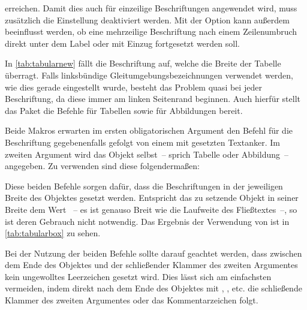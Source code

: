 \documentclass[%
  english,ngerman,%
  cdgeometry=no,DIV=12,automark,%
]{tudscrartcl}
\begin{document}
erreichen. Damit dies auch für einzeilige Beschriftungen angewendet wird, muss 
zusätzlich die Einstellung  deaktiviert werden. Mit der 
Option  kann außerdem beeinflusst werden, ob eine mehrzeilige 
Beschriftung nach einem Zeilenumbruch direkt unter dem Label oder mit Einzug 
fortgesetzt werden soll.
%
\begin{Preamble*}
\captionsetup{singlelinecheck=off,format=hang,justification=raggedright}
\end{Preamble*}
%
In \autoref{tab:tabularnew} fällt die Beschriftung auf, welche die Breite der 
Tabelle überragt. Falls linksbündige Gleitumgebungsbezeichnungen verwendet 
werden, wie dies gerade eingestellt wurde, besteht das Problem quasi bei jeder 
Beschriftung, da diese immer am linken Seitenrand beginnen. Auch hierfür stellt 
das Paket  die Befehle  für Tabellen sowie 
 für Abbildungen bereit. 

Beide Makros erwarten im ersten obligatorischen Argument den Befehl 
 für die Beschriftung gegebenenfalls gefolgt von einem mit 
 gesetzten Textanker. Im zweiten Argument wird das Objekt 
selbst~-- sprich Tabelle oder Abbildung~-- angegeben. Zu verwenden sind diese 
folgendermaßen:
%
%
Diese beiden Befehle sorgen dafür, dass die Beschriftungen in der jeweiligen 
Breite des Objektes gesetzt werden. Entspricht das zu setzende Objekt in seiner 
Breite dem Wert ~-- es ist genauso Breit wie die Laufweite 
des Fließtextes~--, so ist deren Gebrauch nicht notwendig. Das Ergebnis der 
Verwendung von  ist in \autoref{tab:tabularbox} zu sehen.

Bei der Nutzung der beiden Befehle sollte darauf geachtet werden, dass zwischen 
dem Ende des Objektes und der schließender Klammer des zweiten Argumentes kein 
ungewolltes Leerzeichen gesetzt wird. Dies lässt sich am einfachsten vermeiden, 
indem direkt nach dem Ende des Objektes mit , 
,  etc. die schließende 
Klammer des zweiten Argumentes oder das Kommentarzeichen \PValue{\%} folgt.
\end{document}

